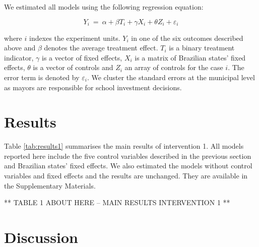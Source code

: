 \documentclass[12pt,a4paper,]{article}
\begin{document}
We estimated all models using the following regression equation:

\[ Y_i \ = \ \alpha + \beta T_i + \gamma X_i + \theta Z_i + \varepsilon_i \]

where \(i\) indexes the experiment units. \(Y_i\) in one of the six
outcomes described above and \(\beta\) denotes the average treatment
effect. \(T_i\) is a binary treatment indicator, \(\gamma\) is a vector
of fixed effects, \(X_i\) is a matrix of Brazilian states' fixed
effects, \(\theta\) is a vector of controls and \(Z_i\) an array of
controls for the case \(i\). The error term is denoted by
\(\varepsilon_i\). We cluster the standard errors at the municipal level
as mayors are responsible for school investment decisions.

\hypertarget{results}{%
\section{Results}\label{results}}

\label{sec:results}

Table \ref{tab:results1} summarises the main results of intervention 1.
All models reported here include the five control variables described in
the previous section and Brazilian states' fixed effects. We also
estimated the models without control variables and fixed effects and the
results are unchanged. They are available in the Supplementary
Materials.

** TABLE 1 ABOUT HERE -- MAIN RESULTS INTERVENTION 1 **

\hypertarget{discussion}{%
\section{Discussion}\label{discussion}}

\label{sec:discussion}

\newpage
\setlength{\parindent}{0cm}
\setlength{\parskip}{5pt}


\end{document}
